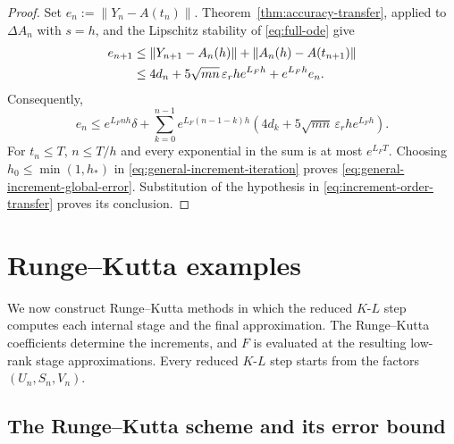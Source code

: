 \documentclass[]{article}
\numberwithin{equation}{section}
\theoremstyle{plain}
\theoremstyle{remark}
\numberwithin{algorithm}{section}
\newcommand{\eps}{\varepsilon}
\begin{document}
\begin{proof}
Set \(e_n:=\|Y_n-A(t_n)\|\).  Theorem~\ref{thm:accuracy-transfer}, applied
to \(\Delta A_n\) with \(s=h\), and the Lipschitz stability of
\eqref{eq:full-ode} give
\begin{align}
 e_{n+1}
 &\le \|Y_{n+1}-A_n(h)\|+\|A_n(h)-A(t_{n+1})\| \notag\\
 &\le 4d_n+5\sqrt{mn}\,\eps_rh e^{L_Fh}+e^{L_Fh}e_n.
 \label{eq:general-increment-recurrence}
\end{align}
Consequently,
\begin{equation}\label{eq:general-increment-iteration}
 e_n\le e^{L_Fnh}\delta+
 \sum_{k=0}^{n-1}e^{L_F(n-1-k)h}
 \left(4d_k+5\sqrt{mn}\,\eps_rh e^{L_Fh}\right).
\end{equation}
For \(t_n\le T\), \(n\le T/h\) and every exponential in the sum is at
most \(e^{L_FT}\).  Choosing \(h_0\le\min(1,h_*)\) in
\eqref{eq:general-increment-iteration} proves
\eqref{eq:general-increment-global-error}.  Substitution of the hypothesis
in \eqref{eq:increment-order-transfer} proves its conclusion.
\end{proof}

\section{Runge--Kutta examples}
\label{sec:rk}

We now construct Runge--Kutta methods in which the reduced \(K\)-\(L\) step
computes each internal stage and the final approximation.  The
Runge--Kutta coefficients determine the increments, and \(F\) is
evaluated at the resulting low-rank stage approximations.
Every reduced \(K\)-\(L\) step starts from the factors \((U_n,S_n,V_n)\).

\subsection{The Runge--Kutta scheme and its error bound}
\label{sec:rk-criterion}
\end{document}
